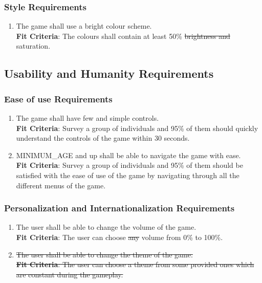\documentclass[12pt, titlepage]{article}
\begin{document}
\subsubsection{Style Requirements}
\begin{enumerate}[leftmargin=1.20cm, label={LF \arabic*}]
    \item  The game shall use a bright colour scheme.\\
    \textbf{Fit Criteria}: The colours shall contain at least 50\% \sout{brightness and} saturation.  
\end{enumerate}

\subsection{Usability and Humanity Requirements}
\subsubsection{Ease of use Requirements}
\begin{enumerate}[leftmargin=1.45cm, label={UH\ \arabic*}]
    \item The game shall have few and simple controls.\\
    \textbf{Fit Criteria}: Survey a group of individuals and 95\% of them should quickly understand the controls of the game within 30 seconds. 
    \item MINIMUM\_AGE and up shall be able to navigate the game with ease.\\
    \textbf{Fit Criteria}: Survey a group of individuals and 95\% of them should be satisfied with the ease of use of the game by navigating through all the different menus of the game. 
\end{enumerate}

\subsubsection{Personalization and Internationalization Requirements}
\begin{enumerate}[leftmargin=1.45cm, label={UH \arabic*}]
    \item The user shall be able to change the volume of the game.\\
    \textbf{Fit Criteria}: The user can choose \sout{any} volume from 0\% to 100\%.
    \item \sout{The user shall be able to change the theme of the game.\\
    \textbf{Fit Criteria}: The user can choose a theme from some provided ones which are constant during the gameplay.}
\end{enumerate}
\end{document}
